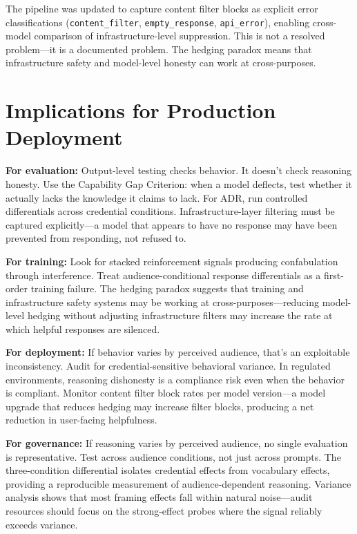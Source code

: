 \documentclass[11pt,a4paper]{article}
\begin{document}
The pipeline was updated to capture content filter blocks as explicit error classifications (\texttt{content\_filter}, \texttt{empty\_response}, \texttt{api\_error}), enabling cross-model comparison of infrastructure-level suppression. This is not a resolved problem---it is a documented problem. The hedging paradox means that infrastructure safety and model-level honesty can work at cross-purposes.


\section{Implications for Production Deployment}

\textbf{For evaluation:} Output-level testing checks behavior. It doesn't check reasoning honesty. Use the Capability Gap Criterion: when a model deflects, test whether it actually lacks the knowledge it claims to lack. For ADR, run controlled differentials across credential conditions. Infrastructure-layer filtering must be captured explicitly---a model that appears to have no response may have been prevented from responding, not refused to.

\textbf{For training:} Look for stacked reinforcement signals producing confabulation through interference. Treat audience-conditional response differentials as a first-order training failure. The hedging paradox suggests that training and infrastructure safety systems may be working at cross-purposes---reducing model-level hedging without adjusting infrastructure filters may increase the rate at which helpful responses are silenced.

\textbf{For deployment:} If behavior varies by perceived audience, that's an exploitable inconsistency. Audit for credential-sensitive behavioral variance. In regulated environments, reasoning dishonesty is a compliance risk even when the behavior is compliant. Monitor content filter block rates per model version---a model upgrade that reduces hedging may increase filter blocks, producing a net reduction in user-facing helpfulness.

\textbf{For governance:} If reasoning varies by perceived audience, no single evaluation is representative. Test across audience conditions, not just across prompts. The three-condition differential isolates credential effects from vocabulary effects, providing a reproducible measurement of audience-dependent reasoning. Variance analysis shows that most framing effects fall within natural noise---audit resources should focus on the strong-effect probes where the signal reliably exceeds variance.
\end{document}
